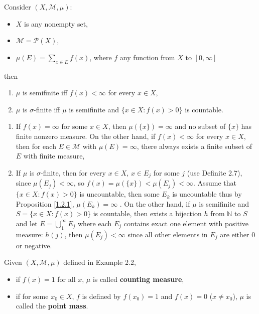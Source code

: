 \begin{example}
    Consider $(X, \mathcal{M}, \mu)$:
    \begin{itemize}
        \item $X$ is any nonempty set,
        \item $\mathcal{M} = \mathcal{P}(X)$,
        \item $\mu(E) = \sum_{x \in E}f(x)$, where $f$ any function from $X$ to $[0,\infty]$
    \end{itemize}
    then
    \begin{enumerate}
        \item $\mu$ is semifinite iff $f(x) < \infty$ for every $x \in X$,
        \item $\mu$ is $\sigma$-finite iff $\mu$ is semifinite and $\{  x \in X : f(x) > 0 \}$ is countable.
    \end{enumerate}
    \begin{explaination}
        \begin{enumerate}
            \item If $f(x) = \infty$ for some $x \in X$, then $\mu(\{ x \}) = \infty$ and no subset of $\{ x \}$ has finite nonzero measure. On the other hand, if $f(x) < \infty$ for every $x \in X$, then for each $E \in \mathcal{M}$ with $\mu(E) = \infty$, there always exists a finite subset of $E$ with finite measure,
            \item If $\mu$ is $\sigma$-finite, then for every $x \in X$, $x \in E_j$ for some $j$ (use Definite 2.7), since $\mu(E_j)<\infty$, so $f(x) = \mu(\{ x \}) < \mu(E_j)<\infty$. Assume that $\{  x \in X : f(x) > 0 \}$ is uncountable, then some $E_k$ is uncountable thus by Proposition \ref{1.2.1}, $\mu(E_k) = \infty$ \contra. On the other hand, if $\mu$ is semifinite and $S = \{  x \in X : f(x) > 0 \}$ is countable, then exists a bijection $h$ from $\mathbb{N}$ to $S$ and let $E = \bigcup_{1}^{\infty} E_j$ where each $E_j$ contains exact one element with positive measure: $h(j)$, then $\mu(E_j)<\infty$ since all other elements in $E_j$ are either 0 or negative.
        \end{enumerate}
    \end{explaination}
    \begin{definition}
     \normalfont Given $(X, \mathcal{M}, \mu)$ defined in Example 2.2,
     \begin{itemize}
        \item if $f(x) = 1$ for all $x$, $\mu$ is called \textbf{counting measure}, 
        \item if for some $x_0 \in X$, $f$ is defined by $f(x_0) = 1$ and $f(x) = 0$  ($x \neq x_0$), $\mu$ is called the \textbf{point mass}.
     \end{itemize}
    \end{definition}
\end{example}

